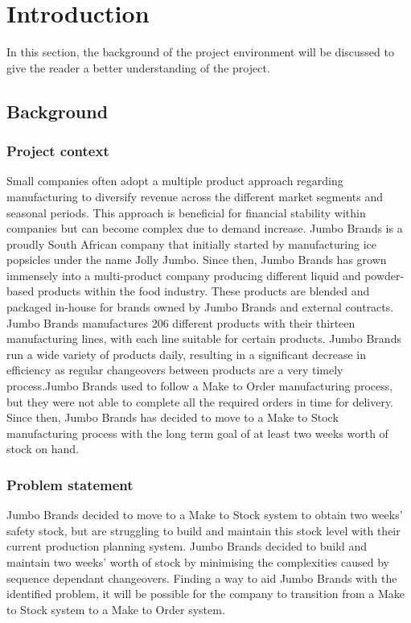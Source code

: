 \documentclass[a4paper,11pt,fleqn]{report}
\begin{document}
\chapter{Introduction}
\setcounter{page}{1}
\acresetall

In this section, the background of the project environment will be discussed to give the reader a better understanding of the project.

    \section{Background}
        \subsection{Project context}
            Small companies often adopt a multiple product approach regarding manufacturing to diversify revenue across the different market segments and seasonal periods. This approach is beneficial for financial stability within companies but can become complex due to demand increase. Jumbo Brands is a proudly South African company that initially started by manufacturing ice popsicles under the name Jolly Jumbo. Since then, Jumbo Brands has grown immensely into a multi-product company producing different liquid and powder-based products within the food industry. These products are blended and packaged in-house for brands owned by Jumbo Brands and external contracts. Jumbo Brands manufactures 206 different products with their thirteen manufacturing lines, with each line suitable for certain products. Jumbo Brands run a wide variety of products daily, resulting in a significant decrease in efficiency as regular changeovers between products are a very timely process.Jumbo Brands used to follow a Make to Order manufacturing process, but they were not able to complete all the required orders in time for delivery. Since then, Jumbo Brands has decided to move to a Make to Stock manufacturing process with the long term goal of at least two weeks worth of stock on hand.
        \subsection{Problem statement}
            Jumbo Brands decided to move to a Make to Stock system to obtain two weeks’ safety stock, but are struggling to build and maintain this stock level with their current production planning system. Jumbo Brands decided to build and maintain two weeks’ worth of stock by minimising the complexities caused by sequence dependant changeovers. Finding a way to aid Jumbo Brands with the identified problem, it will be possible for the company to transition from a Make to Stock system to a Make to Order system.
\end{document}
